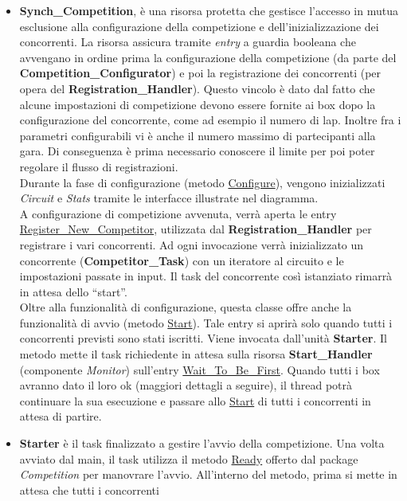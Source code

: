\begin{itemize}
\item \textbf{Synch\_Competition}, \`{e} una risorsa protetta che gestisce l'accesso in mutua esclusione alla configurazione della competizione
e dell'inizializzazione dei concorrenti. La risorsa assicura tramite \emph{entry} a guardia booleana
che avvengano in ordine prima la configurazione
della competizione (da parte del \textbf{Competition\_Configurator}) e poi la registrazione dei concorrenti (per opera del \textbf{Registration\_Handler}).
Questo vincolo \`{e} dato dal fatto che alcune impostazioni di competizione devono essere fornite ai box dopo la configurazione del concorrente, 
come ad esempio il numero di lap. Inoltre fra i parametri configurabili vi \`{e} anche il numero massimo di partecipanti alla gara. Di conseguenza
\`{e} prima necessario conoscere il limite per poi poter regolare il flusso di registrazioni.\\
Durante la fase di configurazione (metodo \underline{Configure}), vengono inizializzati \emph{Circuit} e \emph{Stats} tramite le interfacce
illustrate nel diagramma.\\
A configurazione di competizione avvenuta, verr\`{a} aperta le entry\\ \underline{Register\_New\_Competitor}, utilizzata dal \textbf{Registration\_Handler}
per registrare i vari concorrenti. Ad ogni invocazione verr\`{a} inizializzato un concorrente (\textbf{Competitor\_Task}) con un iteratore al circuito
e le impostazioni passate in input. Il task del concorrente cos\`{i} istanziato rimarr\`{a} in attesa dello ``start''.\\
Oltre alla funzionalit\`{a} di configurazione, questa classe offre anche la funzionalit\`{a} di avvio (metodo \underline{Start}).
Tale entry si aprir\`{a} solo quando tutti i concorrenti previsti sono stati iscritti. Viene invocata dall'unit\`{a} \textbf{Starter}.
Il metodo mette il task richiedente in attesa sulla risorsa \textbf{Start\_Handler} (componente \emph{Monitor}) sull'entry \underline{Wait\_To\_Be\_First}.
Quando tutti i box avranno dato il loro ok (maggiori dettagli a seguire), il thread potr\`{a} continuare la sua esecuzione e passare allo \underline{Start}
di tutti i concorrenti in attesa di partire.
\item \textbf{Starter} \`{e} il task finalizzato a gestire l'avvio della competizione. Una volta avviato dal main, il task utilizza il metodo \underline{Ready}
offerto dal package \emph{Competition} per manovrare l'avvio. All'interno del metodo, prima si mette in attesa che tutti i concorrenti

\end{itemize}
